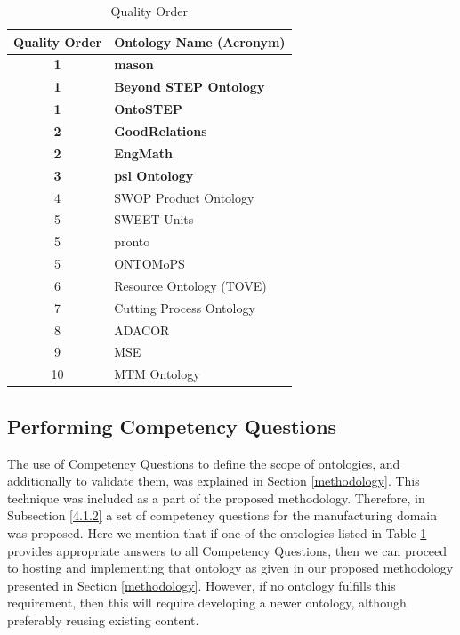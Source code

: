 \begin{table}[tp]%
	
	\caption{Quality Order}
	\label{table4.2}\centering %
	\begin{tabular}{cl}
		\toprule %
		Quality Order &	Ontology Name (Acronym) \\\toprule
		
		\textbf{1}&	\textbf{\gls{mason}} \\\toprule
		\textbf{1}&	\textbf{Beyond STEP Ontology}\\\toprule
		\textbf{1}&	\textbf{OntoSTEP}\\\toprule
		\textbf{2}&	\textbf{GoodRelations}\\\toprule
		\textbf{2}&	\textbf{EngMath}\\\toprule
		\textbf{3}&	\textbf{\gls{psl} Ontology}\\\toprule
		4&	SWOP Product Ontology \\\toprule
		5&	SWEET Units\\\toprule
		5&	\gls{pronto}\\\toprule
		5&	ONTOMoPS\\\toprule
		6&	Resource Ontology (TOVE)\\\toprule
		7&	Cutting Process Ontology\\\toprule
		8&	ADACOR\\\toprule
		9&	MSE\\\toprule
		10&	MTM Ontology\\\toprule
		
		
		
		
	\end{tabular}
	
	
\end{table}



\subsection{Performing Competency Questions}\label{subsection4.2.3}

The use of Competency Questions to define the scope of ontologies, and additionally to validate them, was explained in Section \ref{methodology}. This technique was included as a part of the proposed methodology.   Therefore, in Subsection \ref{4.1.2} a set of competency questions for the manufacturing domain was proposed. Here we mention that if one of the ontologies listed in  Table \ref{table4.2} provides appropriate answers to all Competency Questions, then we can proceed to hosting and implementing that ontology as given in our proposed methodology presented in Section \ref{methodology}. However, if no ontology fulfills this requirement, then this will require developing a newer ontology, although preferably reusing existing content.  

